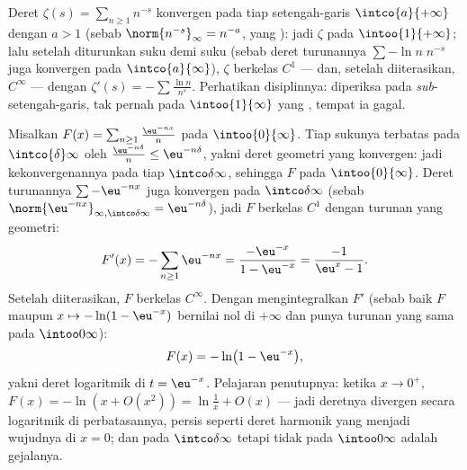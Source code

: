 \begin{example}\label{ex:b2:funcseq:zeta}
Deret $\zeta(s) = \sum_{n\geq1} n^{-s}$ konvergen  pada tiap
setengah-garis $\intco{a}{+\infty}$ dengan $a > 1$ (sebab
$\norm{n^{-s}}_\infty = n^{-a}$, yang ): jadi $\zeta$
 pada $\intoo{1}{+\infty}$; lalu setelah diturunkan suku demi
suku (sebab deret turunannya $\sum -\ln n\; n^{-s}$ juga konvergen
 pada $\intco{a}{\infty}$), $\zeta$ berkelas $C^1$ --- dan, setelah
diiterasikan, $C^\infty$ --- dengan $\zeta'(s) = -\sum \frac{\ln
n}{n^s}$. Perhatikan disiplinnya:  diperiksa pada
\emph{sub}-setengah-garis, tak pernah pada $\intoo{1}{\infty}$ yang
, tempat ia gagal.
\end{example}

\begin{example}\label{ex:b2:funcseq:logseries}
Misalkan $F(x) = \sum_{n\geq1} \frac{\eu^{-nx}}{n}$ pada
$\intoo{0}{\infty}$. Tiap sukunya terbatas pada $\intco{\delta}\infty$
oleh $\frac{\eu^{-n\delta}}{n} \leq \eu^{-n\delta}$, yakni deret
geometri yang konvergen: jadi kekonvergenannya  pada tiap
$\intco\delta\infty$, sehingga $F$  pada
$\intoo{0}{\infty}$. Deret turunannya $\sum -\eu^{-nx}$ juga
konvergen  pada $\intco\delta\infty$ (sebab
$\norm{\eu^{-nx}}_{\infty,\intco\delta\infty} = \eu^{-n\delta}$), jadi
$F$ berkelas $C^1$ dengan turunan yang geometri:
\[
F'(x) = -\sum_{n\geq1}\eu^{-nx}
= \frac{-\eu^{-x}}{1 - \eu^{-x}}
= \frac{-1}{\eu^{x} - 1} .
\]
Setelah diiterasikan, $F$ berkelas $C^\infty$. Dengan mengintegralkan
$F'$ (sebab baik $F$ maupun $x \mapsto -\ln(1 - \eu^{-x})$ bernilai nol
di $+\infty$ dan punya turunan yang sama pada $\intoo0\infty$):
\[
F(x) = -\ln\bigl(1 - \eu^{-x}\bigr),
\]
yakni deret logaritmik di $t = \eu^{-x}$. Pelajaran penutupnya: ketika $x
\to 0^+$, $F(x) = -\ln(x + O(x^2)) = \ln\frac1x + O(x)$ --- jadi
deretnya divergen secara logaritmik di perbatasannya, persis seperti
deret harmonik yang menjadi wujudnya di $x = 0$; dan  pada $\intco\delta\infty$ tetapi tidak pada $\intoo0\infty$
adalah gejalanya.
\end{example}

